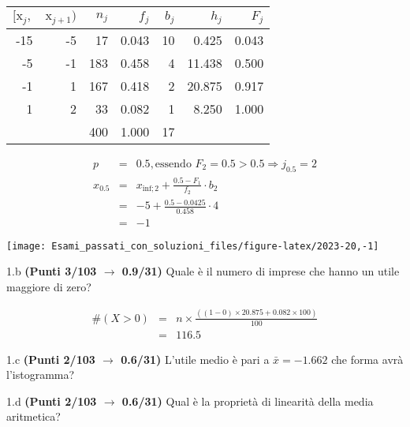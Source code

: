 \documentclass[
  11pt,
]{book}
\theoremstyle{mytheoremstyle}
\theoremstyle{mydefstyle}
\newenvironment{sol}
  {
  \begin{tcolorbox}[enhanced,breakable,arc=0.1mm,boxrule=1pt,colback=white,colframe=iblue,
  title=\bf \fontfamily{lmss}\selectfont \hspace{.5 cm} Soluzione,drop fuzzy shadow]

}{
\end{tcolorbox}
  }
\begin{document}
\begin{sol}

\begin{table}[H]
\centering
\begin{tabular}{rrrrrrr}
\toprule
$[\text{x}_j,$ & $\text{x}_{j+1})$ & $n_j$ & $f_j$ & $b_j$ & $h_j$ & $F_j$\\
\midrule
-15 & -5 & 17 & 0.043 & 10 & 0.425 & 0.043\\
-5 & -1 & 183 & 0.458 & 4 & 11.438 & 0.500\\
-1 & 1 & 167 & 0.418 & 2 & 20.875 & 0.917\\
1 & 2 & 33 & 0.082 & 1 & 8.250 & 1.000\\
 &  & 400 & 1.000 & 17 &  & \\
\bottomrule
\end{tabular}
\end{table}

\begin{eqnarray*}
  p &=&  0.5 , \text{essendo }F_{ 2 }= 0.5  > 0.5  \Rightarrow j_{ 0.5 }= 2 \\
  x_{ 0.5 } &=& x_{\text{inf}; 2 } + \frac{ { 0.5 } - F_{ 1 }} {f_{ 2 }} \cdot b_{ 2 } \\
            &=&  -5  + \frac {{ 0.5 } -  0.0425 } { 0.458 } \cdot  4  \\
            &=&  -1 
\end{eqnarray*}

\begin{center}\texttt{[image: Esami\_passati\_con\_soluzioni\_files/figure-latex/2023-20,-1]} \end{center}

\end{sol}

1.b \textbf{(Punti 3/103 \(\rightarrow\) 0.9/31)} Quale è il numero di imprese che hanno un utile maggiore di zero?

\begin{sol}
\begin{eqnarray*}
  \#(X>0) &=& n\times \frac{((1-0)\times 20.875+0.082\times 100)}{100}\\
   &=& 116.5
\end{eqnarray*}

\end{sol}

1.c \textbf{(Punti 2/103 \(\rightarrow\) 0.6/31)} L'utile medio è pari a \(\bar x=-1.662\) che forma avrà l'istogramma?

1.d \textbf{(Punti 2/103 \(\rightarrow\) 0.6/31)} Qual è la proprietà di linearità della media aritmetica?
\end{document}
